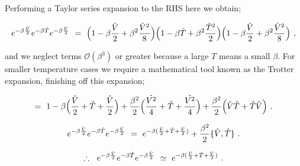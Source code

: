\documentclass{ece}
\begin{document}
Performing a Taylor series expansion to the RHS here we obtain;

\begin{equation} \label{eq:6}
e^{-\beta \frac{\hat{V}}{2}} e^{-\beta \hat{T}} e^{-\beta \frac{\hat{V}}{2}} \hspace{0.125cm} = \hspace{0.125cm} \Big( 1 - \beta \frac{\hat{V}}{2} + \beta^2 \frac{\hat{V}^2}{8} \Big) \Big( 1 - \beta \hat{T} + \beta^2 \frac{\hat{T}^2}{2} \Big) \Big( 1 - \beta \frac{\hat{V}}{2} + \beta^2 \frac{\hat{V}^2}{8} \Big) \hspace{0.125cm} ,
\end{equation}

and we neglect terms \begin{math} \mathcal{O}(\beta^3) \end{math} or greater because a large \begin{math} T \end{math} means a small \begin{math} \beta \end{math}. For smaller temperature cases we require a mathematical tool known as the Trotter expansion, finishing off this expansion;

\begin{equation} \label{eq:7}
= \hspace{0.125cm} 1 - \beta \Big( \frac{\hat{V}}{2} + \hat{T} + \frac{\hat{V}}{2} \Big) + \frac{\beta^2}{2} \Big( \frac{\hat{V^2}}{4} + \hat{T} + \frac{\hat{V^2}}{4} \Big) +  \frac{\beta^2}{2} \Big( \hat{V} \hat{T} + \hat{T} \hat{V} \Big) \hspace{0.125cm} .
\end{equation}

\begin{equation} \label{eq:8}
e^{-\beta \frac{\hat{V}}{2}} e^{-\beta \hat{T}} e^{-\beta \frac{\hat{V}}{2}} \hspace{0.125cm} = \hspace{0.125cm} e^{-\beta ( \frac{\hat{V}}{2} + \hat{T} + \frac{\hat{V}}{2} )} + \frac{\beta^2}{2} \{ \hat{V} , \hat{T} \}  \hspace{0.125cm} .
\end{equation}

\begin{equation} \label{eq:9}
\therefore  \hspace{0.225cm}  e^{-\beta \frac{\hat{V}}{2}} e^{-\beta \hat{T}} e^{-\beta \frac{\hat{V}}{2}} \hspace{0.125cm} \simeq \hspace{0.125cm} e^{-\beta ( \frac{\hat{V}}{2} + \hat{T} + \frac{\hat{V}}{2} )} \hspace{0.125cm} .
\end{equation}
\end{document}
